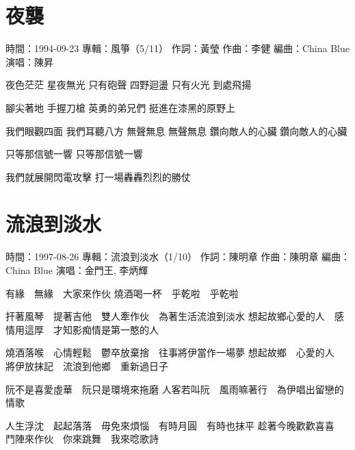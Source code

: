 \documentclass[UTF8,a4paper,oneside,twocolumn,12pt]{ctexbook}
\newcommand{\infopair}[2]{\textbullet #1：#2}
\newcommand{\zc}[1][伍佰]{\infopair{作詞}{#1}}
\newcommand{\zq}[1][伍佰]{\infopair{作曲}{#1}}
\newcommand{\bq}[1][伍佰]{\infopair{編曲}{#1}}
\newcommand{\zj}[1]{\infopair{專輯}{#1}}
\newcommand{\sj}[1]{\infopair{時間}{#1}}
\newenvironment{info}{\begin{flushleft}\kaishu
	}
	{\end{flushleft}\normalsize\yahei\par}
\newenvironment{lyric}{
	}
{}
\begin{document}
\section{夜襲}
\begin{info}%
	\sj{1994-09-23}
	\zj{風箏（5/11）}
	\zc[黃瑩]
	\zq[李健]
	\bq[China Blue]
	\infopair{演唱}{陳昇}
\end{info}
\begin{lyric}%
	夜色茫茫 星夜無光
	只有砲聲 四野迴盪
	只有火光 到處飛揚

	腳尖著地 手握刀槍
	英勇的弟兄們 挺進在漆黑的原野上

	我們眼觀四面 我們耳聽八方
	無聲無息 無聲無息
	鑽向敵人的心臟 鑽向敵人的心臟

	只等那信號一響
	只等那信號一響

	我們就展開閃電攻擊
	打一場轟轟烈烈的勝仗
\end{lyric}

\section{流浪到淡水}
\begin{info}
	\sj{1997-08-26}%
	\zj{流浪到淡水（1/10）}
	\zc[陳明章]
	\zq[陳明章]
	\bq[China Blue]
	\infopair{演唱}{金門王, 李炳輝}
\end{info}
\begin{lyric}
	有緣　無緣　大家來作伙
	燒酒喝一杯　乎乾啦　乎乾啦

	扞著風琴　提著吉他　雙人牽作伙　為著生活流浪到淡水
	想起故鄉心愛的人　感情用這厚　才知影痴情是第一憨的人

	燒酒落喉　心情輕鬆　鬱卒放棄捨　往事將伊當作一場夢
	想起故鄉　心愛的人　將伊放抹記　流浪到他鄉　重新過日子

	阮不是喜愛虛華　阮只是環境來拖磨
	人客若叫阮　風雨嘛著行　為伊唱出留戀的情歌

	人生浮沈　起起落落　毋免來煩惱　有時月圓　有時也抹平
	趁著今晚歡歡喜喜　鬥陣來作伙　你來跳舞　我來唸歌詩
\end{lyric}
\end{document}
